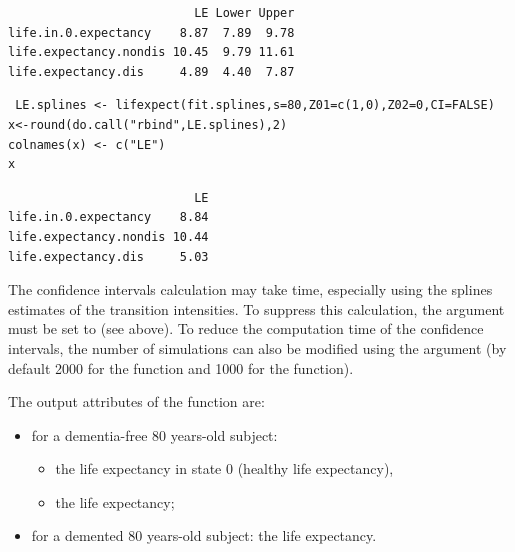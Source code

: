 \documentclass[article]{jss}
\begin{document}
\begin{verbatim}
                          LE Lower Upper
life.in.0.expectancy    8.87  7.89  9.78
life.expectancy.nondis 10.45  9.79 11.61
life.expectancy.dis     4.89  4.40  7.87
\end{verbatim}

\lstset{language=R,label= ,caption= ,numbers=none}
\begin{lstlisting}
 LE.splines <- lifexpect(fit.splines,s=80,Z01=c(1,0),Z02=0,CI=FALSE)
x<-round(do.call("rbind",LE.splines),2)
colnames(x) <- c("LE")
x
\end{lstlisting}

\begin{verbatim}
                          LE
life.in.0.expectancy    8.84
life.expectancy.nondis 10.44
life.expectancy.dis     5.03
\end{verbatim}

The confidence intervals calculation may take time, especially using the splines estimates of the transition intensities.
To suppress this calculation, the  argument must be set to  (see above).
To reduce the computation time of the confidence intervals, the number of simulations 
can also be modified using the  argument 
(by default 2000 for the  function and 1000 for the  function).

The output attributes of  the  function are:
\begin{itemize}
\item for a dementia-free 80 years-old subject:
\begin{itemize}
\item the life expectancy in state 0 (healthy life expectancy),
\item the life expectancy;
\end{itemize}
\item for a demented 80 years-old subject: the life expectancy.
\end{itemize}
\end{document}
